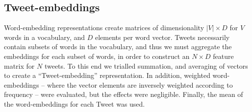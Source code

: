 \subsection{Tweet-embeddings}
Word-embedding representations create matrices of dimensionality $|V| \times D$ for $V$ words in a vocabulary, and $D$ elements per word vector. Tweets necessarily contain subsets of words in the vocabulary, and thus we must aggregate the embeddings for each subset of words, in order to construct an $N \times D$ feature matrix for $N$ tweets. To this end we trialled summation, and averaging of vectors to create a ``Tweet-embedding'' representation. In addition, weighted word-embeddings -- where the vector elements are inversely weighted according to frequency -- were evaluated, but the effects were negligible. \cite{schnabel2015evaluation} Finally, the mean of the word-embeddings for each Tweet was used.
